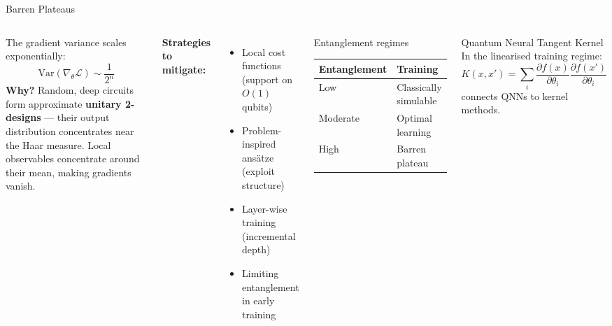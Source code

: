 \documentclass[aspectratio=169,10pt]{beamer}
\begin{document}
\begin{frame}{Barren Plateaus}
  \begin{columns}[T]
      The gradient variance scales exponentially:
      \[
        \mathrm{Var}(\nabla_\theta \mathcal{L}) \sim \frac{1}{2^n}
      \]
      \textbf{Why?} Random, deep circuits form approximate
      \textbf{unitary 2-designs} — their output distribution
      concentrates near the Haar measure.  Local observables
      concentrate around their mean, making gradients vanish.

      \medskip
      \textbf{Strategies to mitigate:}
      \begin{itemize}
        \item Local cost functions (support on $O(1)$ qubits)
        \item Problem-inspired ansätze (exploit structure)
        \item Layer-wise training (incremental depth)
        \item Limiting entanglement in early training
      \end{itemize}
      \begin{block}{Entanglement regimes}
        \begin{tabular}{ll}
          \toprule
          Entanglement & Training \\
          \midrule
          Low & Classically simulable \\
          Moderate & Optimal learning \\
          High & Barren plateau \\
          \bottomrule
        \end{tabular}
      \end{block}
      \vspace{0.3cm}
      \begin{alertblock}{Quantum Neural Tangent Kernel}
        In the linearised training regime:
        \[
          K(x,x')=\sum_i
            \frac{\partial f(x)}{\partial\theta_i}
            \frac{\partial f(x')}{\partial\theta_i}
        \]
        connects QNNs to kernel methods.
      \end{alertblock}
  \end{columns}
\end{frame}
\end{document}
